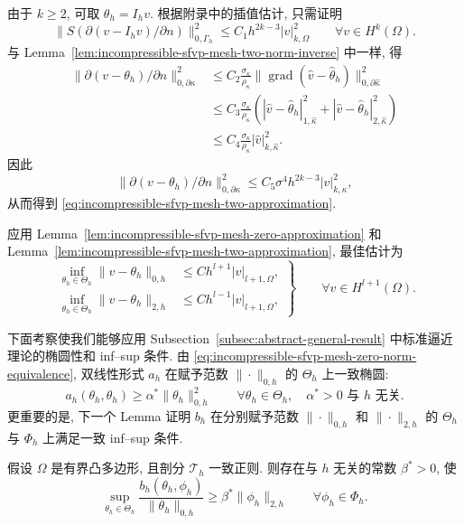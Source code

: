 \begin{Proof}
由于 $k\geq2$, 可取 $\theta_h=I_hv$.
根据附录中的插值估计, 只需证明
\[
\|S(\partial(v-I_hv)/\partial n)\|_{0,\Gamma_h}^2
\leq C_1h^{2k-3}|v|_{k,\Omega}^2
\qquad\forall v\in H^k(\Omega).
\]
与 Lemma~\ref{lem:incompressible-sfvp-mesh-two-norm-inverse}
中一样, 得
\[
\begin{split}
\|\partial(v-\theta_h)/\partial n\|_{0,\partial\kappa}^2
&\leq C_2\frac{\sigma_\kappa}{\rho_\kappa}
\|\operatorname{grad}(\widehat v-\widehat\theta_h)\|_{0,\partial\widehat\kappa}^2\\
&\leq C_3\frac{\sigma_\kappa}{\rho_\kappa}
\left(|\widehat v-\widehat\theta_h|_{1,\widehat\kappa}^2
+|\widehat v-\widehat\theta_h|_{2,\widehat\kappa}^2\right)\\
&\leq C_4\frac{\sigma_\kappa}{\rho_\kappa}
|\widehat v|_{k,\widehat\kappa}^2.
\end{split}
\]
因此
\[
\|\partial(v-\theta_h)/\partial n\|_{0,\partial\kappa}^2
\leq C_5\sigma^4h^{2k-3}|v|_{k,\kappa}^2,
\]
从而得到 \eqref{eq:incompressible-sfvp-mesh-two-approximation}.
\end{Proof}

应用 Lemma~\ref{lem:incompressible-sfvp-mesh-zero-approximation}
和 Lemma~\ref{lem:incompressible-sfvp-mesh-two-approximation},
最佳估计为
\[
\left.
\begin{aligned}
\inf_{\theta_h\in\Theta_h}\|v-\theta_h\|_{0,h}
&\leq Ch^{l+1}|v|_{l+1,\Omega},\\
\inf_{\theta_h\in\Theta_h}\|v-\theta_h\|_{2,h}
&\leq Ch^{l-1}|v|_{l+1,\Omega},
\end{aligned}
\right\}
\qquad\forall v\in H^{l+1}(\Omega).
\]

下面考察使我们能够应用 Subsection~\ref{subsec:abstract-general-result}
中标准逼近理论的椭圆性和 inf--sup 条件.
由 \eqref{eq:incompressible-sfvp-mesh-zero-norm-equivalence},
双线性形式 $a_h$ 在赋予范数 $\|\cdot\|_{0,h}$ 的 $\Theta_h$
上一致椭圆:
\begin{equation}\label{eq:incompressible-sfvp-mesh-ellipticity}
a_h(\theta_h,\theta_h)
\geq\alpha^*\|\theta_h\|_{0,h}^2
\qquad\forall\theta_h\in\Theta_h,
\quad \alpha^*>0\text{ 与 }h\text{ 无关}.
\end{equation}
更重要的是, 下一个 Lemma 证明 $b_h$
在分别赋予范数 $\|\cdot\|_{0,h}$ 和 $\|\cdot\|_{2,h}$
的 $\Theta_h$ 与 $\Phi_h$ 上满足一致 inf--sup 条件.

\begin{Lemma}\label{lem:incompressible-sfvp-mesh-inf-sup}
假设 $\Omega$ 是有界凸多边形, 且剖分 $\mathcal T_h$ 一致正则.
则存在与 $h$ 无关的常数 $\beta^*>0$, 使
\begin{equation}\label{eq:incompressible-sfvp-mesh-inf-sup}
\sup_{\theta_h\in\Theta_h}
\frac{b_h(\theta_h,\phi_h)}{\|\theta_h\|_{0,h}}
\geq\beta^*\|\phi_h\|_{2,h}
\qquad\forall\phi_h\in\Phi_h.
\end{equation}
\end{Lemma}

